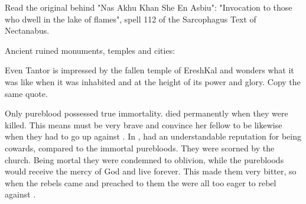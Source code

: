 
Read the original behind "Nas Akhu Khan She En Asbiu": 
"Invocation to those who dwell in the lake of flames", spell 112 of the Sarcophagus Text of Nectanabus.

Ancient ruined monuments, temples and cities:


Even \Jirad Tantor is impressed by the fallen temple of EreshKal and wonders what it was like when it was inhabited and at the height of its power and glory.
Copy the same quote.

Only pureblood \resphain possessed true immortality.
\Ashenbloods died permanently when they were killed.
This means \Achsah must be very brave and convince her fellow \bezedeth to be likewise when they had to go up against \Nzessuacrith.
In \Merkyrah, \bezedeth had an understandable reputation for being cowards, compared to the immortal purebloods. 
They were scorned by the \Merkyran church. 
Being mortal they were condemned to oblivion, while the purebloods would receive the mercy of God and live forever. 
This made them very bitter, so when the rebels came and preached to them the \bezedeth were all too eager to rebel against \Merkyrah.

